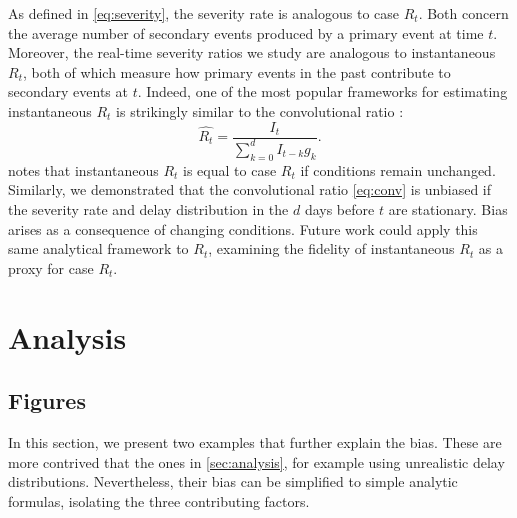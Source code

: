\documentclass{article}
\begin{document}
As defined in \eqref{eq:severity}, the severity rate is analogous to case $R_t$. Both concern the average number of secondary events produced by a primary event at time $t$. Moreover, the real-time severity ratios we study are analogous to instantaneous $R_t$, both of which measure how primary events in the past contribute to secondary events at $t$. Indeed, one of the most popular frameworks for estimating instantaneous $R_t$ is strikingly similar to the convolutional ratio \citep{fraser2007,wallinga2007how,cori2013new,rtestim}:
\begin{equation}\label{eq:instRt}
    \hat{R_t} = \frac{I_t}{\sum_{k=0}^d I_{t-k}g_k}.
\end{equation}
\citet{fraser2007} notes that instantaneous $R_t$ is equal to case $R_t$ if conditions remain unchanged. Similarly, we demonstrated that the convolutional ratio \eqref{eq:conv} is unbiased if the severity rate and delay distribution in the $d$ days before $t$ are stationary. Bias arises as a consequence of changing conditions. Future work could apply this same analytical framework to $R_t$, examining the fidelity of instantaneous $R_t$ as a proxy for case $R_t$. 





\pagebreak
\appendix
\section{Analysis}\label{apx:analysis}
\subsection{Figures}
In this section, we present two examples that further explain the bias. These are more contrived that the ones in \ref{sec:analysis}, for example using unrealistic delay distributions. Nevertheless, their bias can be simplified to simple analytic formulas, isolating the three contributing factors.
\end{document}
